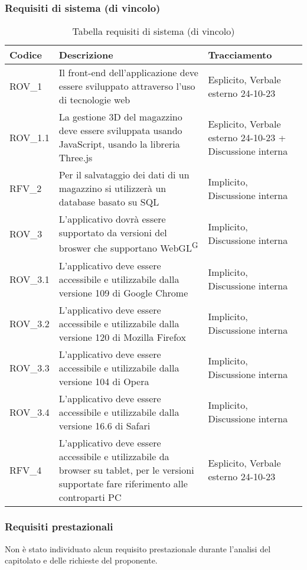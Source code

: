 \subsubsection{Requisiti di sistema (di vincolo)}\label{subsec:requisiti_vincolo}
\begin{xltabular}{\textwidth}{ p{0.1\textwidth} | X | p{0.3\textwidth} }
    \textbf{\color{white} Codice} & \textbf{\color{white} Descrizione} & \textbf{\color{white} Tracciamento} \\ 
    \endhead

    \caption{Tabella requisiti di sistema (di vincolo)}
    \endlastfoot

    ROV\_1 & Il front-end dell'applicazione deve essere sviluppato attraverso l'uso di tecnologie web & Esplicito, Verbale esterno 24-10-23 \\
    ROV\_1.1 & La gestione 3D del magazzino deve essere sviluppata usando JavaScript, usando la libreria Three.js & Esplicito, Verbale esterno 24-10-23 + Discussione interna \\
    RFV\_2 & Per il salvataggio dei dati di un magazzino si utilizzerà un database basato su SQL & Implicito, Discussione interna\\
    ROV\_3 & L'applicativo dovrà essere supportato da versioni del broswer che supportano WebGL\textsuperscript{G} & Implicito, Discussione interna\\
    ROV\_3.1 & L'applicativo deve essere accessibile e utilizzabile dalla versione 109 di Google Chrome & Implicito, Discussione interna\\
    ROV\_3.2 & L'applicativo deve essere accessibile e utilizzabile dalla versione 120 di Mozilla Firefox & Implicito, Discussione interna\\
    ROV\_3.3 & L'applicativo deve essere accessibile e utilizzabile dalla versione 104 di Opera & Implicito, Discussione interna\\
    ROV\_3.4 & L'applicativo deve essere accessibile e utilizzabile dalla versione 16.6 di Safari & Implicito, Discussione interna\\
    RFV\_4 & L'applicativo deve essere accessibile e utilizzabile da browser su tablet, per le versioni supportate fare riferimento alle controparti PC & Esplicito, Verbale esterno 24-10-23\\

    \hline
\end{xltabular}

\subsubsection{Requisiti prestazionali}\label{subsec:requisiti_prestazionali}
Non è stato individuato alcun requisito prestazionale durante l’analisi del capitolato e delle richieste del proponente.

